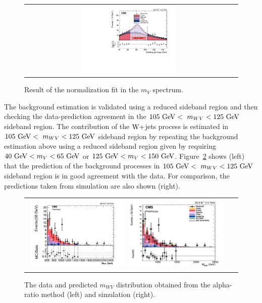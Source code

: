 \begin{figure}[!htbp] 
	 \centering 
	 \begin{tabular}{cc}
	 \includegraphics[width=0.48\textwidth]{Plots/BackgroundEstimation/WV/m_j_fitting/m_j_sideband_WJets0_xww__with_pull.pdf}
	 \end{tabular}
	 \caption{Result of the normalization fit in the $m_{V}$ spectrum.}
	 \label{fig:Wjet_SR_SBR_Comp}
\end{figure}

The background estimation is validated using a reduced sideband region and then checking the data-prediction agreement in the  $105~\mathrm{GeV}<~m_{WV}<125~\mathrm{GeV}$ sideband region. The contribution of the $\mathrm{W}+$jets process is estimated in $105~\mathrm{GeV}<~m_{WV}<125~\mathrm{GeV}$ sideband region by repeating the background estimation above using a reduced sideband region given by requiring $40~\mathrm{GeV} < m_{V} < 65~\mathrm{GeV}$ or $125~\mathrm{GeV} < m_{V} < 150~\mathrm{GeV}$. Figure~\ref{fig:closure} shows (left) that the prediction of the background processes in $105~\mathrm{GeV}<~m_{WV}<125~\mathrm{GeV}$ sideband region is in good agreement with the data. For comparison, the predictions taken from simulation are also shown (right). 

\begin{figure}[!htbp] 
	 \centering 
	 \begin{tabular}{cc}
	 \includegraphics[width=0.48\textwidth]{Plots/BackgroundEstimation/WV/signal_region_Closure_test_AfterCorrShape_38bins.pdf}
         \includegraphics[width=0.48\textwidth]{Plots/BackgroundEstimation/WV/DibosonBoostedElMuCuts13TeV_WjetControlRegion_Tighter_CHS_mass_lvj_type0_PuppiAK8_ClosureTest_SignalRegion.png}  
	 \end{tabular}
	 \caption{The data and predicted $m_{WV}$ distribution obtained from the alpha-ratio method (left) and simulation (right).}
	 \label{fig:closure}
\end{figure}


